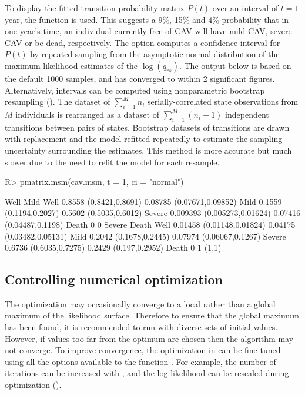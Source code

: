 \documentclass[article,shortnames]{jss}
\begin{document}
To display the fitted transition probability matrix $P(t)$ over an
interval of $t=1$ year, the function  is used.
This suggests a 9\%, 15\% and 4\% probability that in one year's time,
an individual currently free of CAV will have mild CAV, severe CAV or
be dead, respectively.  The option  computes a
confidence interval for $P(t)$ by repeated sampling from the
asymptotic normal distribution of the maximum likelihood estimates of
the $\log(q_{rs})$.  The output below is based on the default 1000
samples, and has converged to within 2 significant figures.
Alternatively, intervals can be computed using nonparametric bootstrap
resampling (). The dataset of $\sum_{i=1}^M n_i$
serially-correlated state observations from $M$ individuals is
rearranged as a dataset of $\sum_{i=1}^M (n_i-1)$ independent
transitions between pairs of states.  Bootstrap datasets of
transitions are drawn with replacement and the model refitted
repeatedly to estimate the sampling uncertainty surrounding the
estimates.  This method is more accurate but much slower due to the
need to refit the model for each resample.

\begin{CodeChunk}
\begin{CodeInput}
R> pmatrix.msm(cav.msm, t = 1, ci = "normal")
\end{CodeInput}

\begin{CodeOutput}
       Well                        Mild
Well   0.8558 (0.8421,0.8691)      0.08785 (0.07671,0.09852)
Mild   0.1559 (0.1194,0.2027)      0.5602 (0.5035,0.6012)
Severe 0.009393 (0.005273,0.01624) 0.07416 (0.04487,0.1198)
Death  0                           0
       Severe                    Death
Well   0.01458 (0.01148,0.01824) 0.04175 (0.03482,0.05131)
Mild   0.2042 (0.1678,0.2445)    0.07974 (0.06067,0.1267)
Severe 0.6736 (0.6035,0.7275)    0.2429 (0.197,0.2952)
Death  0                         1 (1,1)
\end{CodeOutput}
\end{CodeChunk}

\subsection{Controlling numerical optimization}
The optimization may occasionally converge to a local rather than a
global maximum of the likelihood surface.  Therefore to ensure that
the global maximum has been found, it is recommended to run
 with diverse sets of initial values.  However, if values
too far from the optimum are chosen then the algorithm may not
converge.  To improve convergence, the optimization in 
can be fine-tuned using all the options available to the 
function .  For example, the number of iterations can be
increased with , and the log-likelihood can be rescaled
during optimization ().
\end{document}
